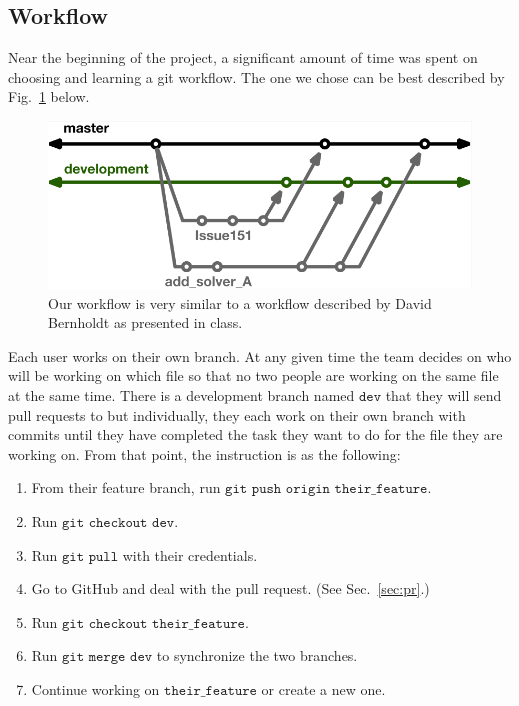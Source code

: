 \documentclass{article}
\begin{document}
\subsection{Workflow}
Near the beginning of the project, a significant amount of time was spent on choosing and learning a git workflow.  The one we chose can be best described by Fig.~\ref{fig:wf} below.  
\begin{figure}[ht]
    \centering
    \includegraphics[width=1\textwidth]{index.png}
    \caption{Our workflow is very similar to a workflow described by David Bernholdt as presented in class.}
    \label{fig:wf}
\end{figure}
Each user works on their own branch.  At any given time the team decides on who will be working on which file so that no two people are working on the same file at the same time.  There is a development branch named $\texttt{dev}$ that they will send pull requests to but individually, they each work on their own branch with commits until they have completed the task they want to do for the file they are working on.  From that point, the instruction is as the following:
\begin{enumerate}
    \item From their feature branch, run $\texttt{git push origin their\_feature}$.
    \item Run $\texttt{git checkout dev}$.
    \item Run $\texttt{git pull}$ with their credentials.
    \item Go to GitHub and deal with the pull request. (See Sec.~\ref{sec:pr}.)
    \item Run $\texttt{git checkout their\_feature}$.
    \item Run $\texttt{git merge dev}$ to synchronize the two branches.
    \item Continue working on $\texttt{their\_feature}$ or create a new one.
\end{enumerate}
\end{document}
